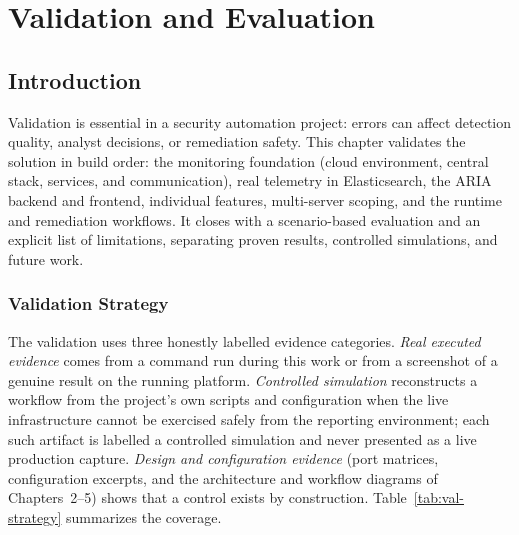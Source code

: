 \chapter{Validation and Evaluation}

\section{Introduction}

Validation is essential in a security automation project: errors can affect detection quality, analyst decisions, or remediation safety. This chapter validates the solution in build order: the monitoring foundation (cloud environment, central stack, services, and communication), real telemetry in Elasticsearch, the ARIA backend and frontend, individual features, multi-server scoping, and the runtime and remediation workflows. It closes with a scenario-based evaluation and an explicit list of limitations, separating proven results, controlled simulations, and future work.

\subsection{Validation Strategy}

The validation uses three honestly labelled evidence categories. \emph{Real executed evidence} comes from a command run during this work or from a screenshot of a genuine result on the running platform. \emph{Controlled simulation} reconstructs a workflow from the project's own scripts and configuration when the live infrastructure cannot be exercised safely from the reporting environment; each such artifact is labelled a controlled simulation and never presented as a live production capture. \emph{Design and configuration evidence} (port matrices, configuration excerpts, and the architecture and workflow diagrams of Chapters~2--5) shows that a control exists by construction. Table~\ref{tab:val-strategy} summarizes the coverage.

